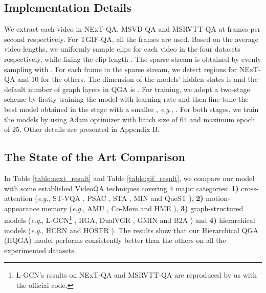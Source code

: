 \documentclass[letterpaper]{article} \usepackage{aaai21}  \usepackage{times}  \usepackage{helvet} \usepackage{courier}  \usepackage[hyphens]{url}  \usepackage{graphicx} \urlstyle{rm} \def\UrlFont{\rm}  \usepackage{natbib}  \usepackage{caption} \usepackage{color, colortbl}
\newcommand{\eg}{\textit{e}.\textit{g}.}
\begin{document}
\subsection{Implementation Details}
We extract each video in NExT-QA, MSVD-QA and MSRVTT-QA at  frames per second respectively. For TGIF-QA, all the frames are used. Based on the average video lengths, we uniformly sample  clips for each video in the four datasets respectively, while fixing the clip length . The sparse stream is obtained by evenly sampling with . For each frame in the sparse stream, we detect  regions for NExT-QA and 10 for the others. The dimension of the models' hidden states is  and the default number of graph layers in QGA is . For training, we adopt a two-stage scheme by firstly training the model with learning rate  and then fine-tune the best model obtained in the  stage with a smaller , \eg, . For both stages, we train the models by using Adam optimizer with batch size of 64 and maximum epoch of 25. Other details are presented in Appendix B.


\subsection{The State of the Art Comparison}
In Table \ref{table:next_result} and Table \ref{table:gif_result}, we compare our model with some established VideoQA techniques covering 4 major categories: \textbf{1)} cross-attention (\eg, ST-VQA \cite{jang2017}, PSAC \cite{li2019beyond}, STA \cite{gao2019structured}, MIN \cite{jin2019multi} and QueST \cite{jiang2020divide}), \textbf{2)} motion-appearance memory (\eg, AMU \cite{xu2017video}, Co-Mem \cite{gao2018motion} and HME \cite{fan2019heterogeneous}), \textbf{3)} graph-structured models (\eg, L-GCN\footnote{L-GCN's results on NExT-QA and MSRVTT-QA are reproduced by us with the official code.} \cite{huang2020location}, HGA\cite{jiang2020reasoning}, DualVGR \cite{wang2021dualvgr}, GMIN \cite{gu2021graph} and B2A \cite{park2021bridge}) and \textbf{4)} hierarchical models (\eg, HCRN \cite{le2020hierarchical} and HOSTR \cite{dang2021hierarchical}). The results show that our Hierarchical QGA (HQGA) model performs consistently better than the others on all the experimented datasets. 
\end{document}
